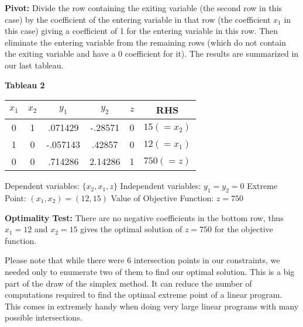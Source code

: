 \begin{example}
\textbf{Pivot: } Divide the row containing the exiting variable (the second row in this case) by the coefficient of the entering variable in that row (the coefficient $x_1$ in this case) giving a coefficient of 1 for the entering variable in this row. Then eliminate the entering variable from the remaining rows (which do not contain the exiting variable and have a 0 coefficient for it). The results are summarized in our last tableau. \newline


\textbf{Tableau 2}\newline
\begin{center}
\begin{tabular}{|c c c c c | c|}
\hline
$x_1$ & $x_2$ & $y_1$ & $y_2$ & $z$ & RHS \\ \hline
0 & 1 & .071429 & -.28571 & 0 & $15 (= x_2)$ \\
1 & 0 & -.057143 & .42857 & 0 & $12 (=x_1)$ \\ \hline
0 & 0 & .714286 & 2.14286 & 1 & $750(=z)$ \\ \hline
\end{tabular}\newline
\end{center}

Dependent variables: $\{x_2,x_1,z\}$ \newline
Independent variables: $y_1=y_2=0$\newline
Extreme Point: $(x_1,x_2) = (12,15)$\newline
Value of Objective Function: $z=750$\newline

\textbf{Optimality Test:} There are no negative coefficients in the bottom row, thus $x_1 = 12$ and $x_2 = 15$ gives the optimal solution of $z=750$ for the objective function.

\end{example}

Please note that while there were 6 intersection points in our constraints, we needed only to enumerate two of them to find our optimal solution. This is a big part of the draw of the simplex method. It can reduce the number of computations required to find the optimal extreme point of a linear program. This comes in extremely handy when doing very large linear programs with many possible intersections.


